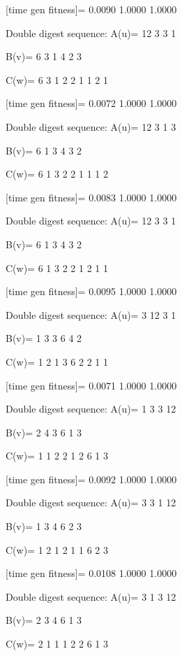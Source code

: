 [time gen fitness]=
    0.0090    1.0000    1.0000

Double digest sequence:
A(u)=
    12     3     3     1

B(v)=
     6     3     1     4     2     3

C(w)=
     6     3     1     2     2     1     1     2     1

[time gen fitness]=
    0.0072    1.0000    1.0000

Double digest sequence:
A(u)=
    12     3     1     3

B(v)=
     6     1     3     4     3     2

C(w)=
     6     1     3     2     2     1     1     1     2

[time gen fitness]=
    0.0083    1.0000    1.0000

Double digest sequence:
A(u)=
    12     3     3     1

B(v)=
     6     1     3     4     3     2

C(w)=
     6     1     3     2     2     1     2     1     1

[time gen fitness]=
    0.0095    1.0000    1.0000

Double digest sequence:
A(u)=
     3    12     3     1

B(v)=
     1     3     3     6     4     2

C(w)=
     1     2     1     3     6     2     2     1     1

[time gen fitness]=
    0.0071    1.0000    1.0000

Double digest sequence:
A(u)=
     1     3     3    12

B(v)=
     2     4     3     6     1     3

C(w)=
     1     1     2     2     1     2     6     1     3

[time gen fitness]=
    0.0092    1.0000    1.0000

Double digest sequence:
A(u)=
     3     3     1    12

B(v)=
     1     3     4     6     2     3

C(w)=
     1     2     1     2     1     1     6     2     3

[time gen fitness]=
    0.0108    1.0000    1.0000

Double digest sequence:
A(u)=
     3     1     3    12

B(v)=
     2     3     4     6     1     3

C(w)=
     2     1     1     1     2     2     6     1     3

